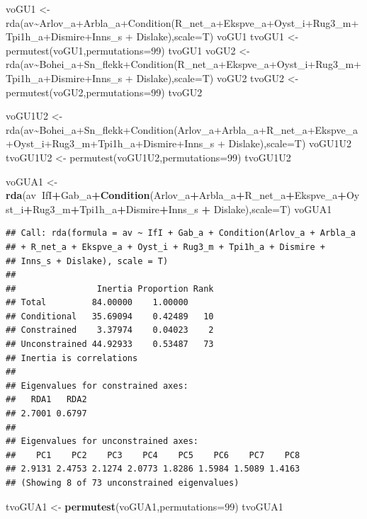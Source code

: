 \documentclass[]{article}
\newenvironment{Shaded}{\begin{snugshade}}{\end{snugshade}}
\newcommand{\DataTypeTok}[1]{\textcolor[rgb]{0.13,0.29,0.53}{#1}}
\newcommand{\DecValTok}[1]{\textcolor[rgb]{0.00,0.00,0.81}{#1}}
\newcommand{\KeywordTok}[1]{\textcolor[rgb]{0.13,0.29,0.53}{\textbf{#1}}}
\newcommand{\NormalTok}[1]{#1}
\newcommand{\OperatorTok}[1]{\textcolor[rgb]{0.81,0.36,0.00}{\textbf{#1}}}
\newcommand{\StringTok}[1]{\textcolor[rgb]{0.31,0.60,0.02}{#1}}
\begin{document}
voGU1 \textless{}-
rda(av\textasciitilde{}Arlov\_a+Arbla\_a+Condition(R\_net\_a+Ekspve\_a+Oyst\_i+Rug3\_m+Tpi1h\_a+Dismire+Inns\_s
+ Dislake),scale=T) voGU1 tvoGU1 \textless{}-
permutest(voGU1,permutations=99) tvoGU1 voGU2 \textless{}-
rda(av\textasciitilde{}Bohei\_a+Sn\_flekk+Condition(R\_net\_a+Ekspve\_a+Oyst\_i+Rug3\_m+Tpi1h\_a+Dismire+Inns\_s
+ Dislake),scale=T) voGU2 tvoGU2 \textless{}-
permutest(voGU2,permutations=99) tvoGU2

voGU1U2 \textless{}-
rda(av\textasciitilde{}Bohei\_a+Sn\_flekk+Condition(Arlov\_a+Arbla\_a+R\_net\_a+Ekspve\_a+Oyst\_i+Rug3\_m+Tpi1h\_a+Dismire+Inns\_s
+ Dislake),scale=T) voGU1U2 tvoGU1U2 \textless{}-
permutest(voGU1U2,permutations=99) tvoGU1U2

\begin{Shaded}
\begin{Highlighting}[]
\NormalTok{voGUA1 <-}\StringTok{ }\KeywordTok{rda}\NormalTok{(av}\OperatorTok{~}\NormalTok{IfI}\OperatorTok{+}\NormalTok{Gab_a}\OperatorTok{+}\KeywordTok{Condition}\NormalTok{(Arlov_a}\OperatorTok{+}\NormalTok{Arbla_a}\OperatorTok{+}\NormalTok{R_net_a}\OperatorTok{+}\NormalTok{Ekspve_a}\OperatorTok{+}\NormalTok{Oyst_i}\OperatorTok{+}\NormalTok{Rug3_m}\OperatorTok{+}\NormalTok{Tpi1h_a}\OperatorTok{+}\NormalTok{Dismire}\OperatorTok{+}\NormalTok{Inns_s }\OperatorTok{+}\StringTok{ }\NormalTok{Dislake),}\DataTypeTok{scale=}\NormalTok{T)}
\NormalTok{voGUA1}
\end{Highlighting}
\end{Shaded}

\begin{verbatim}
## Call: rda(formula = av ~ IfI + Gab_a + Condition(Arlov_a + Arbla_a
## + R_net_a + Ekspve_a + Oyst_i + Rug3_m + Tpi1h_a + Dismire +
## Inns_s + Dislake), scale = T)
## 
##                Inertia Proportion Rank
## Total         84.00000    1.00000     
## Conditional   35.69094    0.42489   10
## Constrained    3.37974    0.04023    2
## Unconstrained 44.92933    0.53487   73
## Inertia is correlations 
## 
## Eigenvalues for constrained axes:
##   RDA1   RDA2 
## 2.7001 0.6797 
## 
## Eigenvalues for unconstrained axes:
##    PC1    PC2    PC3    PC4    PC5    PC6    PC7    PC8 
## 2.9131 2.4753 2.1274 2.0773 1.8286 1.5984 1.5089 1.4163 
## (Showing 8 of 73 unconstrained eigenvalues)
\end{verbatim}

\begin{Shaded}
\begin{Highlighting}[]
\NormalTok{tvoGUA1 <-}\StringTok{ }\KeywordTok{permutest}\NormalTok{(voGUA1,}\DataTypeTok{permutations=}\DecValTok{99}\NormalTok{)}
\NormalTok{tvoGUA1}
\end{Highlighting}
\end{Shaded}
\end{document}
